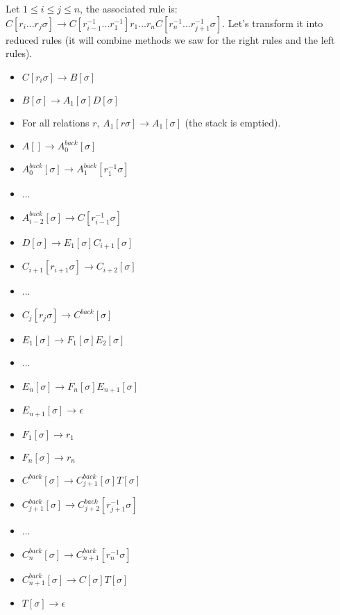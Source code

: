 \documentclass[10pt,a4paper,draft]{article}
\begin{document}
Let $ 1 \leq i \leq j \leq n $, the associated rule is: $C[r_i ... r_j \sigma] \rightarrow C[r_{i-1}^{-1} ... r_1^{-1}]r_1 ... r_n C[r_n^{-1} ... r_{j+1}^{-1} \sigma]$. Let's transform it into reduced rules (it will combine methods we saw for the right rules and the left rules).
\begin{itemize}
\item $C[r_i \sigma] \rightarrow B[\sigma]$
\item $B[\sigma] \rightarrow A_1[\sigma] D[\sigma]$
\item For all relations $r$, $A_1[r \sigma] \rightarrow A_1[\sigma]$ (the stack is emptied).
\item $A[] \rightarrow A^{back}_{0}[\sigma]$
\item $A^{back}_{0}[\sigma] \rightarrow A^{back}_{1}[r_1^{-1} \sigma]$
\item ...
\item $A^{back}_{i-2}[\sigma] \rightarrow C[r_{i-1}^{-1} \sigma]$
\item $D[\sigma] \rightarrow E_1[\sigma]C_{i+1}[\sigma]$

\item $C_{i+1}[r_{i+1} \sigma] \rightarrow C_{i+2}[\sigma]$
\item ...
\item $C_{j}[r_{j} \sigma] \rightarrow C^{back}[\sigma]$

\item $E_1[\sigma] \rightarrow F_1[\sigma] E_2[\sigma]$
\item ...
\item $E_n[\sigma] \rightarrow F_n[\sigma] E_{n+1}[\sigma]$
\item $E_{n+1}[\sigma] \rightarrow \epsilon$
\item $F_1[\sigma] \rightarrow r_1$
\item $F_n[\sigma] \rightarrow r_n$

\item $C^{back}[\sigma] \rightarrow C^{back}_{j+1}[\sigma] T[\sigma]$
\item $C_{j+1}^{back}[\sigma] \rightarrow C^{back}_{j+2}[r^{-1}_{j+1} \sigma]$
\item ...
\item $C_{n}^{back}[\sigma] \rightarrow C^{back}_{n+1}[r^{-1}_{n} \sigma]$
\item $C^{back}_{n+1}[\sigma] \rightarrow C[\sigma] T[\sigma]$
\item $T[\sigma] \rightarrow \epsilon$
\end{itemize}
\end{document}
